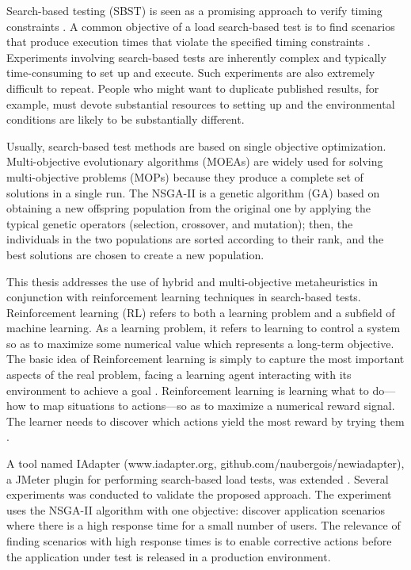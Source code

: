 \documentclass{report}
\begin{document}
Search-based testing (SBST) is seen as a promising approach to verify timing constraints \cite{Afzal2009a}. A common objective of a load search-based test is to find  scenarios that produce execution times that violate the specified timing constraints \cite{Sullivan}. Experiments involving search-based tests are inherently complex and typically time-consuming to set up and
execute. Such experiments are also extremely difficult to
repeat. People who might want to duplicate published results, for example, must devote substantial resources to setting up and the environmental conditions are likely to be substantially different.

Usually,   search-based test methods are based on single objective optimization. Multi-objective evolutionary algorithms (MOEAs) are widely used for solving multi-objective problems (MOPs) because they produce a complete set of solutions in a single run. The NSGA-II  is a genetic algorithm (GA) based on obtaining a new offspring population from the original one by applying the typical genetic operators (selection, crossover, and mutation);
then, the individuals in the two populations are sorted according to their rank, and the best solutions are chosen to create a new population.

This thesis addresses the use of hybrid and multi-objective metaheuristics in conjunction with reinforcement learning techniques in search-based tests. Reinforcement learning (RL) refers to both a learning problem and a subfield of machine learning. As a learning problem, it refers to learning to control a system so as to maximize some numerical value which represents a long-term objective. The basic idea of Reinforcement learning  is simply to capture the most important aspects of the real problem, facing a learning agent interacting with its environment to achieve a goal \cite{Sutton2012}. Reinforcement learning is learning what to do—how to map situations to actions—so as to maximize a numerical reward signal. The learner needs to discover which actions yield the most reward by trying them \cite{Sutton2012}.

A tool named IAdapter (www.iadapter.org, github.com/naubergois/newiadapter), a JMeter plugin for performing search-based load tests, was extended \cite{Gois2016}.  Several experiments was conducted to validate the proposed approach. The experiment uses the NSGA-II algorithm with one objective: discover application scenarios where there is a high response time for a small number of users. The relevance of finding scenarios with high response times is to enable corrective actions before the application under test is released in a production environment.
\end{document}
